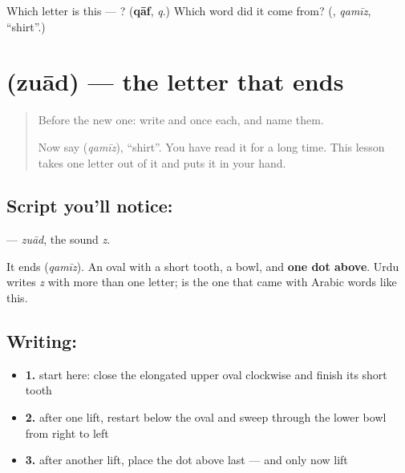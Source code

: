\begin{tcolorbox}[breakable,colback=teal!4,colframe=teal!35!black,title={Before you move on}]
Which letter is this — ? (\textbf{qāf}, \emph{q}.) Which word did it come from? (\textbf{}, \emph{qamīz}, \textquotedblleft{}shirt\textquotedblright{}.)
\end{tcolorbox}
\section[\texorpdfstring{\ur{ض} (zuād)}{ض (zuād)}]{ (zuād) — the letter that ends }

\label{lesson:UR-W37-zuad}



\begin{quote}
Before the new one: write  and  once each, and name them.

Now say \textbf{} (\emph{qamīz}), \textquotedblleft{}shirt\textquotedblright{}. You have read it for a long time. This lesson takes one letter out of it and puts it in your hand.
\end{quote}

\subsection*{Script you'll notice: }
\textbf{} — \emph{zuād}, the sound \emph{z}.

It ends \textbf{} (\emph{qamīz}). An oval with a short tooth, a bowl, and \textbf{one dot above}. Urdu writes \emph{z} with more than one letter; \textbf{} is the one that came with Arabic words like this.

\subsection*{Writing: }

\begin{itemize}
\raggedright
  \item \textbf{1.} start here: close the elongated upper oval clockwise and finish its short tooth
  \item \textbf{2.} after one lift, restart below the oval and sweep through the lower bowl from right to left
  \item \textbf{3.} after another lift, place the dot above last — and only now lift
\end{itemize}

